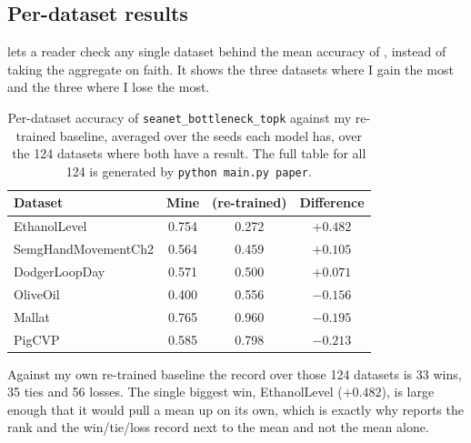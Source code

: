 \subsection{Per-dataset results}
\label{app:per_dataset}

 lets a reader check any single \ucr{} dataset behind the mean accuracy of
, instead of taking the aggregate on faith. It shows the three datasets
where I gain the most and the three where I lose the most.

\begin{table}[htbp]
\caption{Per-dataset accuracy of \texttt{seanet\_bottleneck\_topk} against my re-trained \millet{}
baseline, averaged over the seeds each model has, over the 124 \ucr{} datasets where both have a
result. The full table for all 124 is generated by \texttt{python main.py paper}.}
\label{tab:per_dataset}
\begin{center}
\small
\begin{tabular}{lccc}
\toprule
\textbf{Dataset} & \textbf{Mine} & \textbf{\millet{} (re-trained)} & \textbf{Difference} \\
\midrule
EthanolLevel            & 0.754 & 0.272 & $+0.482$ \\
SemgHandMovementCh2     & 0.564 & 0.459 & $+0.105$ \\
DodgerLoopDay           & 0.571 & 0.500 & $+0.071$ \\
\midrule
OliveOil                & 0.400 & 0.556 & $-0.156$ \\
Mallat                  & 0.765 & 0.960 & $-0.195$ \\
PigCVP                  & 0.585 & 0.798 & $-0.213$ \\
\bottomrule
\end{tabular}
\end{center}
\end{table}

Against my own re-trained baseline the record over those 124 datasets is 33 wins, 35 ties and 56
losses. The single biggest win, EthanolLevel ($+0.482$), is large enough that it would pull a mean
up on its own, which is exactly why  reports the rank and the win/tie/loss
record next to the mean and not the mean alone.

